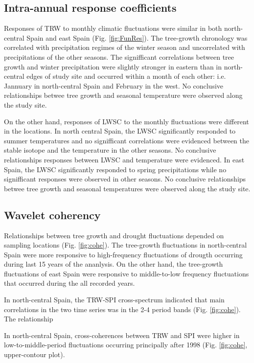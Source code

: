 \documentclass[review,authoryear]{elsarticle}
\begin{document}
\subsection{Intra-annual response coefficients}
Responses of \gls{TRW} to monthly climatic fluctuations were
similar in both north-central Spain and east Spain
(Fig. \ref{fig:FunRes}). The tree-growth chronology was correlated
with precipitation regimes of the winter season and uncorrelated with
precipitations of the other seasons. The signifficant correlations
between tree growth and winter precipitation were slightly stronger in
eastern than in north-central edges of study site and occurred within
a month of each other: i.e. Jannuary in north-central Spain and
February in the west. No conclusive relationships betwee tree growth
and seasonal temperature were observed along the study site.

On the other hand, responses of \gls{LWSC} to the monthly fluctuations
were different in the locations. In north central Spain, the
\gls{LWSC} significantly responded to summer temperatures and no
signifficant correlations were evidenced between the stable isotope
and the temperature in the other seasons. No conclusive relationships
responses between \gls{LWSC} and temperature were evidenced. In east
Spain, the \gls{LWSC} significantly responded to spring precipitations
while no signifficant responses were observed in other seasons. No
conclusive relationships betwee tree growth and seasonal temperatures
were observed along the study site.

\subsection{Wavelet coherency}
Relationships between tree growth and drought fluctuations depended on
sampling locations (Fig. \ref{fig:cohe}). The tree-growth fluctuations
in north-central Spain were more responsive to high-frequency
fluctuations of drougth occurring during last 15 years of the
ananlysis. On the other hand, the tree-growth fluctuations of east
Spain were responsive to middle-to-low frequency fluctuations that
occurred during the all recorded years.

In north-central Spain, the \gls{TRW}-\gls{SPI} cross-spectrum
indicated that main correlations in the two time series was in the 2-4
period bands (Fig. \ref{fig:cohe}). The relationship


In north-central Spain, cross-coherences between \gls{TRW} and
\gls{SPI} were higher in low-to-middle-period fluctuations occurring
principally after 1998 (Fig. \ref{fig:cohe}, upper-contour
plot). 
\end{document}
